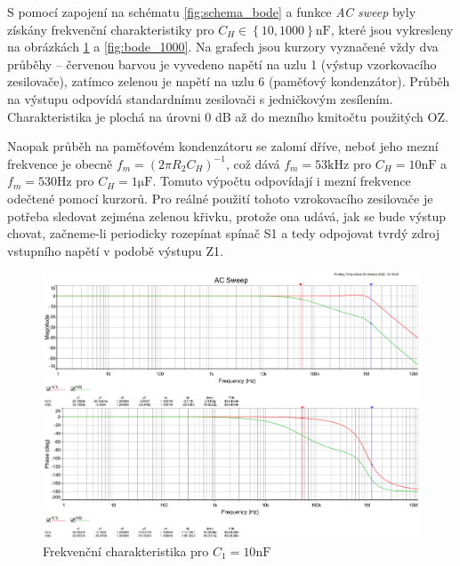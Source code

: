 \documentclass[twoside]{article}
\begin{document}
S pomocí zapojení na schématu \ref{fig:schema_bode} a funkce \textit{AC sweep} byly
získány frekvenční charakteristiky pro $C_H \in \left\{10, 1000\right\} \si{\nano\farad}$,
které jsou vykresleny na obrázkách \ref{fig:bode_10} a \ref{fig:bode_1000}.
Na grafech jsou kurzory vyznačené vždy dva průběhy -- červenou barvou je vyvedeno
napětí na uzlu 1 (výstup vzorkovacího zesilovače), zatímco zelenou je napětí na uzlu 6
(paměťový kondenzátor). Průběh na výstupu odpovídá standardnímu zesilovači s jedničkovým
zesílením. Charakteristika je plochá na úrovni 0 dB až do mezního kmitočtu použitých OZ.

Naopak průběh na paměťovém kondenzátoru se zalomí dříve, neboť jeho mezní frekvence
je obecně $f_m = (2\pi R_2 C_H)^{-1}$, což dává $f_m = 53 \si{\kilo\hertz}$ pro $C_H = 10 \si{\nano\farad}$
a $f_m = 530 \si{\hertz}$ pro $C_H = 1 \si{\micro\farad}$. Tomuto výpočtu odpovídají
i mezní frekvence odečtené pomocí kurzorů.
Pro reálné použití tohoto vzrokovacího zesilovače je potřeba sledovat zejména zelenou křivku,
protože ona udává, jak se bude výstup chovat, začneme-li periodicky rozepínat spínač S1
a tedy odpojovat tvrdý zdroj vstupního napětí v podobě výstupu Z1.


\newpage
\begin{figure}[h!]
    \centering
    \includegraphics[width=0.92\linewidth]{bode_10.pdf}
    \caption{Frekvenční charakteristika pro $C_1 = 10 \si{\nano\farad}$}
    \label{fig:bode_10}
\end{figure}
\end{document}
